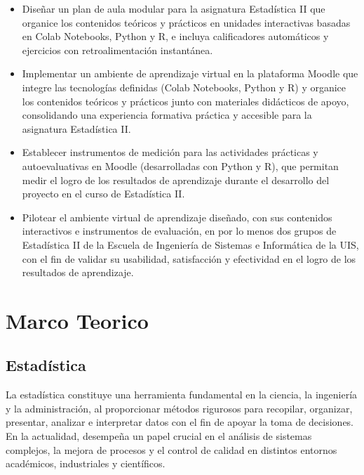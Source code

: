 \documentclass[letter,oneside,12pt,spanish]{report}
\begin{document}
\begin{itemize}
    \item Diseñar un plan de aula modular para la asignatura Estadística II que organice los contenidos teóricos y prácticos en unidades interactivas basadas en Colab Notebooks, Python y R, e incluya calificadores automáticos y ejercicios con retroalimentación instantánea.
    
    \item Implementar un ambiente de aprendizaje virtual en la plataforma Moodle que integre las tecnologías definidas (Colab Notebooks, Python y R) y organice los contenidos teóricos y prácticos junto con materiales didácticos de apoyo, consolidando una experiencia formativa práctica y accesible para la asignatura Estadística II.
    
    \item Establecer instrumentos de medición para las actividades prácticas y autoevaluativas en Moodle (desarrolladas con Python y R), que permitan medir el logro de los resultados de aprendizaje durante el desarrollo del proyecto en el curso de Estadística II.

    \item Pilotear el ambiente virtual de aprendizaje diseñado, con sus contenidos interactivos e instrumentos de evaluación, en por lo menos dos grupos de Estadística II de la Escuela de Ingeniería de Sistemas e Informática de la UIS, con el fin de validar su usabilidad, satisfacción y efectividad en el logro de los resultados de aprendizaje.

\end{itemize}


\newpage

\chapter{Marco Teorico}

\section{Estadística}

La estadística constituye una herramienta fundamental en la ciencia, la ingeniería y la administración, al proporcionar métodos rigurosos para recopilar, organizar, presentar, analizar e interpretar datos con el fin de apoyar la toma de decisiones. En la actualidad, desempeña un papel crucial en el análisis de sistemas complejos, la mejora de procesos y el control de calidad en distintos entornos académicos, industriales y científicos.
\end{document}
